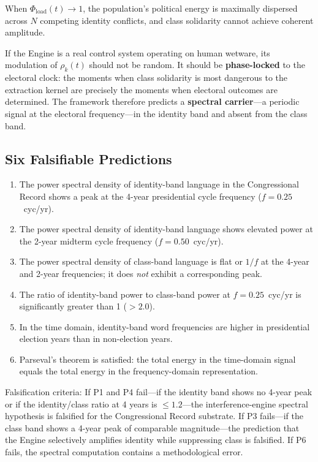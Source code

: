 When $\Phi_{\text{load}}(t) \to 1$, the population's political energy is maximally dispersed across $N$ competing identity conflicts, and class solidarity cannot achieve coherent amplitude.

If the Engine is a real control system operating on human wetware, its modulation of $\rho_k(t)$ should not be random. It should be \textbf{phase-locked} to the electoral clock: the moments when class solidarity is most dangerous to the extraction kernel are precisely the moments when electoral outcomes are determined. The framework therefore predicts a \textbf{spectral carrier}---a periodic signal at the electoral frequency---in the identity band and absent from the class band.

\subsection{Six Falsifiable Predictions}

\begin{enumerate}
    \item[\textbf{P1.}] The power spectral density of identity-band language in the Congressional Record shows a peak at the 4-year presidential cycle frequency ($f = 0.25$~cyc/yr).
    \item[\textbf{P2.}] The power spectral density of identity-band language shows elevated power at the 2-year midterm cycle frequency ($f = 0.50$~cyc/yr).
    \item[\textbf{P3.}] The power spectral density of class-band language is flat or $1/f$ at the 4-year and 2-year frequencies; it does \textit{not} exhibit a corresponding peak.
    \item[\textbf{P4.}] The ratio of identity-band power to class-band power at $f = 0.25$~cyc/yr is significantly greater than 1 ($> 2.0$).
    \item[\textbf{P5.}] In the time domain, identity-band word frequencies are higher in presidential election years than in non-election years.
    \item[\textbf{P6.}] Parseval's theorem is satisfied: the total energy in the time-domain signal equals the total energy in the frequency-domain representation.
\end{enumerate}

Falsification criteria: If P1 and P4 fail---if the identity band shows no 4-year peak or if the identity/class ratio at 4 years is $\leq 1.2$---the interference-engine spectral hypothesis is falsified for the Congressional Record substrate. If P3 fails---if the class band shows a 4-year peak of comparable magnitude---the prediction that the Engine selectively amplifies identity while suppressing class is falsified. If P6 fails, the spectral computation contains a methodological error.

